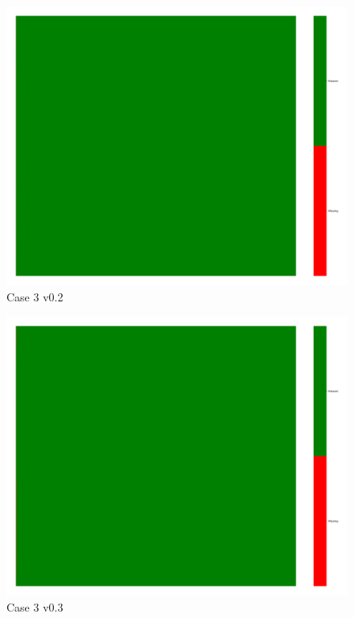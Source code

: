\documentclass[a4paper,12pt]{article}
\begin{document}
\begin{figure}[H]
    \includegraphics[width=\linewidth]{case3_v0.2_heatmap_cleaned.png}
    \caption*{Case 3 v0.2}
\end{figure}

\begin{figure}[H]
    \includegraphics[width=\linewidth]{case3_v0.3_heatmap_cleaned.png}
    \caption*{Case 3 v0.3}
\end{figure}
\end{document}
